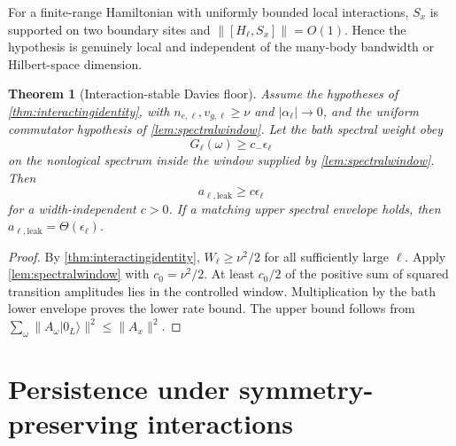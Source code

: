 \documentclass[11pt,a4paper]{article}
\newtheorem{theorem}{Theorem}[section]
\theoremstyle{remark}
\begin{document}
For a finite-range Hamiltonian with uniformly bounded local interactions, $S_x$ is supported on two boundary sites and $\|[H_\ell,S_x]\|=O(1)$.  Hence the hypothesis is genuinely local and independent of the many-body bandwidth or Hilbert-space dimension.

\begin{theorem}[Interaction-stable Davies floor]\label{thm:intDavies}
Assume the hypotheses of \cref{thm:interactingidentity}, with $n_{e,\ell},v_{g,\ell}\ge\nu$ and $|\alpha_\ell|\to0$, and the uniform commutator hypothesis of \cref{lem:spectralwindow}.  Let the bath spectral weight obey
\[
 G_\ell(\omega)\ge c_-\epsilon_\ell
\]
on the nonlogical spectrum inside the window supplied by \cref{lem:spectralwindow}.  Then
\[
 a_{\ell,\mathrm{leak}}
 \ge c\epsilon_\ell
\]
for a width-independent $c>0$.  If a matching upper spectral envelope holds, then $a_{\ell,\mathrm{leak}}=\Theta(\epsilon_\ell)$.
\end{theorem}

\begin{proof}
By \cref{thm:interactingidentity}, $W_\ell\ge\nu^2/2$ for all sufficiently large $\ell$.  Apply \cref{lem:spectralwindow} with $c_0=\nu^2/2$.  At least $c_0/2$ of the positive sum of squared transition amplitudes lies in the controlled window.  Multiplication by the bath lower envelope proves the lower rate bound.  The upper bound follows from $\sum_\omega\|A_\omega|0_L\rangle\|^2\le\|A_x\|^2$.
\end{proof}

\section{Persistence under symmetry-preserving interactions}
\end{document}
